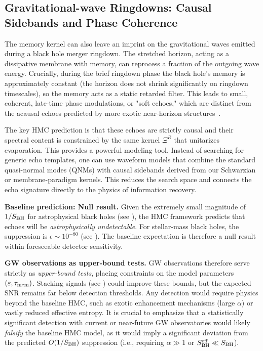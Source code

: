 \documentclass[a4paper,11pt]{article}
\newcommand{\ie}{i.e.\xspace}
\newcommand{\HMC}{\textup{\textsc{HMC}}\xspace}
\theoremstyle{plain}
\theoremstyle{definition}
\theoremstyle{remark}
\begin{document}
\subsection{Gravitational-wave Ringdowns: Causal Sidebands and Phase Coherence}
The memory kernel can also leave an imprint on the gravitational waves emitted during a black hole merger ringdown. The stretched horizon, acting as a dissipative membrane with memory, can reprocess a fraction of the outgoing wave energy. Crucially, during the brief ringdown phase the black hole's memory is approximately constant (the horizon does not shrink significantly on ringdown timescales), so the memory acts as a static retarded filter. This leads to small, coherent, late-time phase modulations, or "soft echoes," which are distinct from the acausal echoes predicted by more exotic near-horizon structures~\cite{Cardoso:2016, Abedi:2017}.

The key \HMC{} prediction is that these echoes are strictly causal and their spectral content is constrained by the same kernel $\Xi^R$ that unitarizes evaporation. This provides a powerful modeling tool. Instead of searching for generic echo templates, one can use waveform models that combine the standard quasi-normal modes (QNMs) with causal sidebands derived from our Schwarzian or membrane-paradigm kernels. This reduces the search space and connects the echo signature directly to the physics of information recovery. 

\textbf{Baseline prediction: Null result.} Given the extremely small magnitude of $1/S_{\rm BH}$ for astrophysical black holes (see ), the \HMC{} framework predicts that echoes will be \emph{astrophysically undetectable}. For stellar-mass black holes, the suppression is $\epsilon\sim 10^{-80}$ (see ). The baseline expectation is therefore a null result within foreseeable detector sensitivity.

\textbf{GW observations as upper-bound tests.} GW observations therefore serve strictly as \emph{upper-bound tests}, placing constraints on the model parameters $(\varepsilon,\tau_{\rm mem})$. Stacking signals (see ) could improve these bounds, but the expected SNR remains far below detection thresholds. Any detection would require physics beyond the baseline \HMC{}, such as exotic enhancement mechanisms (large $\alpha$) or vastly reduced effective entropy.
It is crucial to emphasize that a statistically significant detection with current or near-future GW observatories would likely \emph{falsify} the baseline \HMC{} model, as it would imply a significant deviation from the predicted $O(1/S_{\rm BH})$ suppression (\ie, requiring $\alpha \gg 1$ or $S_{\rm BH}^{\rm eff} \ll S_{\rm BH}$).
\end{document}
